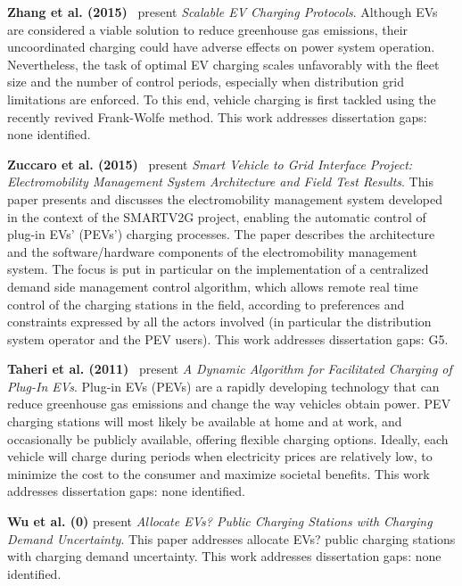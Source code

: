 \documentclass[letterpaper, 12pt, oneside, doublespacing]{Thesis}
\begin{document}
\noindent \textbf{Zhang et al. (2015)}~\cite{scalable_electric_2015} present \textit{Scalable EV Charging Protocols}. Although EVs are considered a viable solution to reduce greenhouse gas emissions, their uncoordinated charging could have adverse effects on power system operation. Nevertheless, the task of optimal EV charging scales unfavorably with the fleet size and the number of control periods, especially when distribution grid limitations are enforced. To this end, vehicle charging is first tackled using the recently revived Frank-Wolfe method. This work addresses dissertation gaps: none identified.



\noindent \textbf{Zuccaro et al. (2015)}~\cite{smart_vehicle_2015} present \textit{Smart Vehicle to Grid Interface Project: Electromobility Management System Architecture and Field Test Results}. This paper presents and discusses the electromobility management system developed in the context of the SMARTV2G project, enabling the automatic control of plug-in EVs' (PEVs') charging processes. The paper describes the architecture and the software/hardware components of the electromobility management system. The focus is put in particular on the implementation of a centralized demand side management control algorithm, which allows remote real time control of the charging stations in the field, according to preferences and constraints expressed by all the actors involved (in particular the distribution system operator and the PEV users). This work addresses dissertation gaps: G5.



\noindent \textbf{Taheri et al. (2011)}~\cite{a_dynamic_2011} present \textit{A Dynamic Algorithm for Facilitated Charging of Plug-In EVs}. Plug-in EVs (PEVs) are a rapidly developing technology that can reduce greenhouse gas emissions and change the way vehicles obtain power. PEV charging stations will most likely be available at home and at work, and occasionally be publicly available, offering flexible charging options. Ideally, each vehicle will charge during periods when electricity prices are relatively low, to minimize the cost to the consumer and maximize societal benefits. This work addresses dissertation gaps: none identified.



\noindent \textbf{Wu et al. (0)} present \textit{Allocate EVs? Public Charging Stations with Charging Demand Uncertainty}. This paper addresses allocate EVs? public charging stations with charging demand uncertainty. This work addresses dissertation gaps: none identified.
\end{document}
